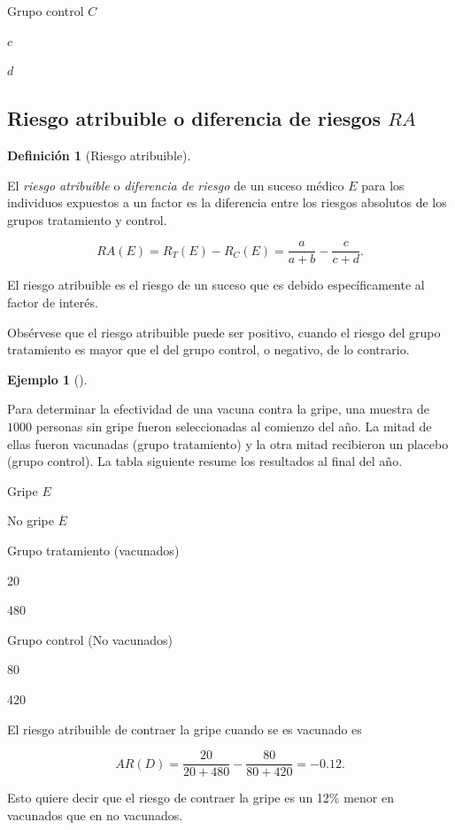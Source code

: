 \documentclass[
  a4paper,
]{scrreport}
\theoremstyle{plain}
\theoremstyle{definition}
\newtheorem{example}{Ejemplo}[chapter]
\theoremstyle{definition}
\newtheorem{definition}{Definición}[chapter]
\theoremstyle{remark}
\begin{document}
Grupo control \(C\)

\(c\)

\(d\)

\subsection{\texorpdfstring{Riesgo atribuible o diferencia de riesgos
\(RA\)}{Riesgo atribuible o diferencia de riesgos RA}}\label{riesgo-atribuible-o-diferencia-de-riesgos-ra}

\begin{definition}[Riesgo
atribuible]\protect\hypertarget{def-riesgo-atribuible}{}\label{def-riesgo-atribuible}

El \emph{riesgo atribuible} o \emph{diferencia de riesgo} de un suceso
médico \(E\) para los individuos expuestos a un factor es la diferencia
entre los riesgos absolutos de los grupos tratamiento y control.

\[RA(E)=R_T(E)-R_C(E)=\frac{a}{a+b}-\frac{c}{c+d}.\]

\end{definition}

El riesgo atribuible es el riesgo de un suceso que es debido
específicamente al factor de interés.

Obsérvese que el riesgo atribuible puede ser positivo, cuando el riesgo
del grupo tratamiento es mayor que el del grupo control, o negativo, de
lo contrario.

\begin{example}[]\protect\hypertarget{exm-riesgo-atribuible}{}\label{exm-riesgo-atribuible}

Para determinar la efectividad de una vacuna contra la gripe, una
muestra de \(1000\) personas sin gripe fueron seleccionadas al comienzo
del año. La mitad de ellas fueron vacunadas (grupo tratamiento) y la
otra mitad recibieron un placebo (grupo control). La tabla siguiente
resume los resultados al final del año.

Gripe \(E\)

No gripe \(\overline E\)

Grupo tratamiento (vacunados)

20

480

Grupo control (No vacunados)

80

420

El riesgo atribuible de contraer la gripe cuando se es vacunado es

\[AR(D) = \frac{20}{20+480}-\frac{80}{80+420} = -0.12.\]

Esto quiere decir que el riesgo de contraer la gripe es un 12\% menor en
vacunados que en no vacunados.

\end{example}
\end{document}
